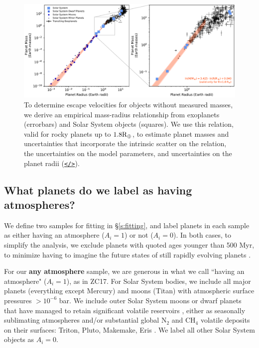 \documentclass[modern,linenumbers,trackchanges]{aastex7}
\begin{document}
\begin{figure}[ht!]
\includegraphics[width=\textwidth]{figures/mass-radius-relation-for-rocky-planets}
\caption{To determine escape velocities for objects without measured masses, we derive an empirical mass-radius relationship from exoplanets (errorbars) and Solar System objects (squares). We use this relation, valid for rocky planets up to $1.8\rm{R}_\oplus$, to estimate planet masses and uncertainties that incorporate the intrinsic scatter on the relation, the uncertainties on the model parameters, and uncertainties on the planet radii (\href{https://github.com/zkbt/shoreline/blob/main/notebooks/fit-mass-radius-relation.ipynb}{\texttt{</>}}).
}
\label{f:mass-radius}
\end{figure}

\subsection{What planets do we label as having atmospheres?}

We define two samples for fitting in \S\ref{s:fitting}, and label planets in each sample as either having an atmosphere ($A_i = 1$) or not  ($A_i = 0$). In both cases, to simplify the analysis, we exclude planets with quoted ages younger than 500 Myr, to minimize having to imagine the future states of still rapidly evolving planets \citep{lopezUnderstandingMassRadiusRelation2014a, chenEvolutionaryAnalysisGaseous2016b,  thaoFeatherweightGiantUnraveling2024b}. 

For our {\bf any atmosphere} sample, we are generous in what we call ``having an atmosphere" ($A_i = 1$), as in ZC17. For Solar System bodies, we include all major planets (everything except Mercury) and moons (Titan) with atmospheric surface pressures $>10^{-6}$ bar. We include outer Solar System moons or dwarf planets that have managed to retain significant volatile reservoirs \citep{schallerVolatileLossRetention2007}, either as seasonally sublimating atmospheres and/or substantial global N$_2$ and CH$_4$ volatile deposits on their surfaces: Triton, Pluto, Makemake, Eris \citep{youngStructureCompositionPlutos2018, sicardyConstraintsEvolutionTriton2024, grundyModerateRatiosMethane2024}. We label all other Solar System objects as $A_i = 0$.
\end{document}
